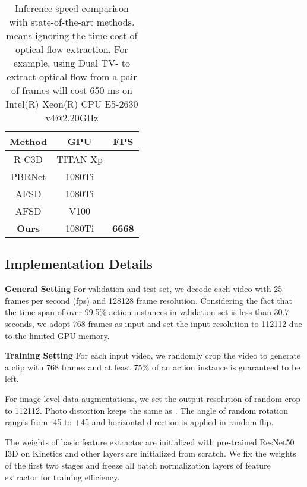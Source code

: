 \documentclass[final]{cvpr}
\begin{document}
\begin{table}[htbp]
    \caption{Inference speed comparison with state-of-the-art methods.  means ignoring the time cost of optical flow extraction. For example, using Dual TV- \cite{zach2007duality} to extract optical flow from a pair of  frames will cost 650 ms on Intel(R) Xeon(R) CPU E5-2630 v4@2.20GHz}
    \centering
    \begin{tabular}{ c | c | c }
        \toprule
        Method & GPU & FPS \\
        \midrule
        R-C3D \cite{xu2017r} & TITAN Xp &  \\
        PBRNet \cite{liu2020progressive} & 1080Ti &  \\
        AFSD \cite{lin2021learning} & 1080Ti &  \\
        AFSD \cite{lin2021learning} & V100 &  \\
        \midrule
        \textbf{Ours} & 1080Ti & \textbf{6668} \\
        \bottomrule
    \end{tabular}
    \label{tab:fps}
\end{table}

\subsection{Implementation Details}
\textbf{General Setting}
For validation and test set, we decode each video with 25 frames per second (fps) and 128128 frame resolution. Considering the fact that the time span of over 99.5\% action instances in validation set is less than 30.7 seconds, we adopt 768 frames as input and set the input resolution to 112112 due to the limited GPU memory.

\textbf{Training Setting}
For each input video, we randomly crop the video to generate a clip with 768 frames and at least 75\% of an action instance is guaranteed to be left. 

For image level data augmentations, we set the output resolution of random crop to 112112. Photo distortion keeps the same as \cite{liu2016ssd}. The angle of random rotation ranges from -45 to +45 and horizontal direction is applied in random flip.

The weights of basic feature extractor are initialized with pre-trained ResNet50 I3D on Kinetics \cite{kay2017kinetics} and other layers are initialized from scratch. We fix the weights of the first two stages and freeze all batch normalization layers of feature extractor for training efficiency. 
\end{document}
